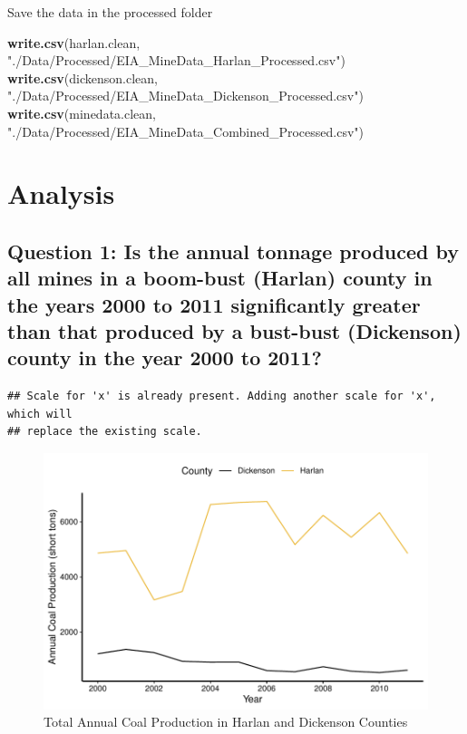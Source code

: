 \documentclass[12pt,]{article}
\newenvironment{Shaded}{\begin{snugshade}}{\end{snugshade}}
\newcommand{\KeywordTok}[1]{\textcolor[rgb]{0.13,0.29,0.53}{\textbf{#1}}}
\newcommand{\NormalTok}[1]{#1}
\newcommand{\StringTok}[1]{\textcolor[rgb]{0.31,0.60,0.02}{#1}}
\begin{document}
Save the data in the processed folder

\begin{Shaded}
\begin{Highlighting}[]
\KeywordTok{write.csv}\NormalTok{(harlan.clean, }\StringTok{"./Data/Processed/EIA_MineData_Harlan_Processed.csv"}\NormalTok{)}
\KeywordTok{write.csv}\NormalTok{(dickenson.clean, }\StringTok{"./Data/Processed/EIA_MineData_Dickenson_Processed.csv"}\NormalTok{)}
\KeywordTok{write.csv}\NormalTok{(minedata.clean, }\StringTok{"./Data/Processed/EIA_MineData_Combined_Processed.csv"}\NormalTok{)}
\end{Highlighting}
\end{Shaded}

\newpage

\hypertarget{analysis}{%
\section{Analysis}\label{analysis}}

\hypertarget{question-1-is-the-annual-tonnage-produced-by-all-mines-in-a-boom-bust-harlan-county-in-the-years-2000-to-2011-significantly-greater-than-that-produced-by-a-bust-bust-dickenson-county-in-the-year-2000-to-2011}{%
\subsection{Question 1: Is the annual tonnage produced by all mines in a
boom-bust (Harlan) county in the years 2000 to 2011 significantly
greater than that produced by a bust-bust (Dickenson) county in the year
2000 to
2011?}\label{question-1-is-the-annual-tonnage-produced-by-all-mines-in-a-boom-bust-harlan-county-in-the-years-2000-to-2011-significantly-greater-than-that-produced-by-a-bust-bust-dickenson-county-in-the-year-2000-to-2011}}

\begin{verbatim}
## Scale for 'x' is already present. Adding another scale for 'x', which will
## replace the existing scale.
\end{verbatim}

\begin{figure}
\centering
\includegraphics{Smith_ENV872_Project_files/figure-latex/unnamed-chunk-7-1.pdf}
\caption{\label{fig:figs} Total Annual Coal Production in Harlan and
Dickenson Counties}
\end{figure}
\end{document}
